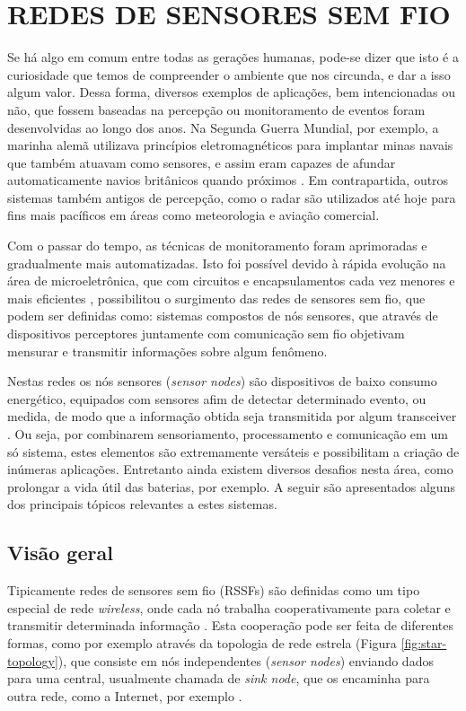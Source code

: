 \documentclass[oneside,openright,12pt]{ufsm_2015} %
\begin{document}
\section{REDES DE SENSORES SEM FIO}
Se há algo em comum entre todas as gerações humanas, pode-se dizer que isto é a curiosidade que temos de compreender o ambiente que nos circunda, e dar a isso algum valor. Dessa forma, diversos exemplos de aplicações, bem intencionadas ou não, que fossem baseadas na percepção ou monitoramento de eventos foram desenvolvidas ao longo dos anos. Na Segunda Guerra Mundial, por exemplo, a marinha alemã utilizava princípios eletromagnéticos para implantar minas navais que também atuavam como sensores, e assim eram capazes de afundar automaticamente navios britânicos quando próximos \cite{HowBrita11:online}. Em contrapartida, outros sistemas também antigos de percepção, como o radar são utilizados até hoje para fins mais pacíficos em áreas como meteorologia e aviação comercial. 

Com o passar do tempo, as técnicas de monitoramento foram aprimoradas e gradualmente mais automatizadas. Isto foi possível devido à rápida evolução na área de microeletrônica, que com circuitos e encapsulamentos cada vez menores e mais eficientes \cite{renna2007evolution}, possibilitou o surgimento das redes de sensores sem fio, que podem ser definidas como: sistemas compostos de nós sensores, que através de dispositivos perceptores juntamente com comunicação sem fio objetivam mensurar e transmitir informações sobre algum fenômeno. 

Nestas redes os nós sensores (\textit{sensor nodes}) são dispositivos de baixo consumo energético, equipados com sensores afim de detectar determinado evento, ou medida, de modo que a informação obtida seja transmitida por algum transceiver \cite{oliveira2011wireless}. Ou seja, por combinarem sensoriamento, processamento e comunicação em um só sistema, estes elementos são extremamente versáteis e possibilitam a criação de inúmeras aplicações. Entretanto ainda existem diversos desafios nesta área, como prolongar a vida útil das baterias, por exemplo. A seguir são apresentados alguns dos principais tópicos relevantes a estes sistemas.

\subsection{Visão geral}
Tipicamente redes de sensores sem fio (RSSFs) são definidas como um tipo especial de rede \textit{wireless}, onde cada nó trabalha cooperativamente para coletar e transmitir determinada informação \cite{loureiro2003redes}. Esta cooperação pode ser feita de diferentes formas, como por exemplo através da topologia de rede estrela (Figura \ref{fig:star-topology}), que consiste em nós independentes (\textit{sensor nodes}) enviando dados para uma central, usualmente chamada de \textit{sink node}, que os encaminha para outra rede, como a Internet, por exemplo \cite{buratti2009overview}. 
\end{document}

